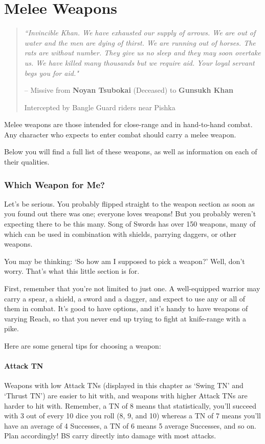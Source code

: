 \documentclass[oneside,11pt,english]{book}
\begin{document}
\chapter{Melee Weapons}\label{ch:Melee Weapons}
\startcontents[chapters]
\clearpage
\begin{quote}
  \emph{“Invincible Khan. We have exhausted our supply of arrows. We are out of
    water and the men are dying of thirst. We are running out of horses. The
    rats are without number. They give us no sleep and they may soon overtake
    us. We have killed many thousands but we require aid. Your loyal servant
    begs you for aid."}
  
  \hfill -- Missive from \textbf{Noyan Tsubokai} (Deceased) to \textbf{Gunsukh Khan}

  \hfill Intercepted by Bangle Guard riders near Pishka 
\end{quote}
Melee weapons are those intended for close-range and in hand-to-hand combat. Any
character who expects to enter combat should carry a melee weapon.

Below you will find a full list of these weapons, as well as information on each
of their qualities.

\subsection{Which Weapon for Me?}
Let’s be serious. You probably flipped straight to the weapon section as soon as
you found out there was one; everyone loves weapons! But you probably weren’t
expecting there to be this many. Song of Swords has over 150 weapons, many of
which can be used in combination with shields, parrying daggers, or other
weapons.

You may be thinking: ‘So how am I supposed to pick a weapon?’ Well, don’t worry.
That’s what this little section is for.

First, remember that you’re not limited to just one. A well-equipped warrior may
carry a spear, a shield, a sword and a dagger, and expect to use any or all of
them in combat. It’s good to have options, and it’s handy to have weapons of
varying Reach, so that you never end up trying to fight at knife-range with a
pike.

Here are some general tips for choosing a weapon:
\subsubsection{Attack TN}
Weapons with low Attack TNs (displayed in this chapter as ‘Swing TN’ and ‘Thrust
TN’) are easier to hit with, and weapons with higher Attack TNs are harder to
hit with. Remember, a TN of 8 means that statistically, you’ll succeed with 3
out of every 10 dice you roll (8, 9, and 10) whereas a TN of 7 means you’ll have
an average of 4 Successes, a TN of 6 means 5 average Successes, and so on. Plan
accordingly! BS carry directly into damage with most attacks.
\end{document}
